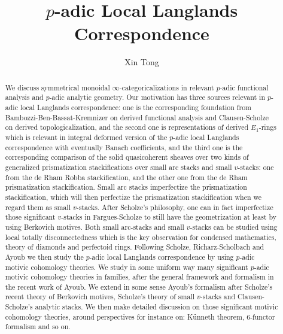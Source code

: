 \documentclass[12pt]{article}
\theoremstyle{definition}
\begin{document}
\title{$p$-adic Local Langlands Correspondence}
\author{Xin Tong}
\date{}




\maketitle



\begin{abstract}
\noindent We discuss symmetrical monoidal $\infty$-categoricalizations in relevant $p$-adic functional analysis and $p$-adic analytic geometry. Our motivation has three sources relevant in $p$-adic local Langlands correspondence: one is the corresponding foundation from Bambozzi-Ben-Bassat-Kremnizer on derived functional analysis and Clausen-Scholze on derived topologicalization, and the second one is representations of derived $E_1$-rings which is relevant in integral deformed version of the $p$-adic local Langlands correspondence with eventually Banach coefficients, and the third one is the corresponding comparison of the solid quasicoherent sheaves over two kinds of generalized prismatization stackifications over small arc stacks and small $v$-stacks: one from the de Rham Robba stackification, and the other one from the de Rham prismatization stackification. Small arc stacks imperfectize the prismatization stackification, which will then perfectize the prismatization stackification when we regard them as small $v$-stacks. After Scholze's philosophy, one can in fact imperfectize those significant $v$-stacks in Fargues-Scholze to still have the geometrization at least by using Berkovich motives. Both small arc-stacks and small $v$-stacks can be studied using local totally disconnectedness which is the key observation for condensed mathematics, theory of diamonds and perfectoid rings. Following Scholze, Richarz-Scholbach and Ayoub we then study the $p$-adic local Langlands correspondence by using $p$-adic motivic cohomology theories. We study in some uniform way many significant $p$-adic motivic cohomology theories in families, after the general framework and formalism in the recent work of Ayoub. We extend in some sense Ayoub's formalism after Scholze's recent theory of Berkovich motives, Scholze's theory of small $v$-stacks and Clausen-Scholze's analytic stacks. We then make detailed discussion on those significant motivic cohomology theories, around perspectives for instance on: K\"unneth theorem, 6-functor formalism and so on.   
\end{abstract}
\end{document}
